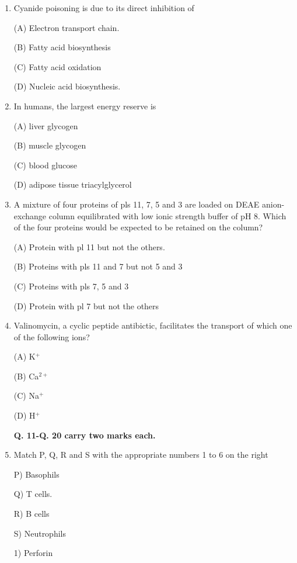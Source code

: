 \documentclass[journal]{IEEEtran}
\begin{document}
\begin{enumerate}
{		(D) its weak electrolytic property}

	\item {Cyanide poisoning is due to its direct inhibition of

(A) Electron transport chain.

(B) Fatty acid biosynthesis

(C) Fatty acid oxidation

		(D) Nucleic acid biosynthesis.}

	\item{ In humans, the largest energy reserve is

(A) liver glycogen

(B) muscle glycogen

(C) blood glucose

(D) adipose tissue triacylglycerol}

\item {A mixture of four proteins of pls 11, 7, 5 and 3 are loaded on DEAE anion-exchange column equilibrated with low ionic strength buffer of pH 8. Which of the four proteins would be expected to be retained on the column?

(A) Protein with pl 11 but not the others.

(B) Proteins with pls 11 and 7 but not 5 and 3

(C) Proteins with pls 7, 5 and 3

(D) Protein with pl 7 but not the others}

\item {Valinomycin, a cyclic peptide antibictic, facilitates the transport of which one of the following ions?}

(A) K$^+$

(B) Ca$^{2+}$

(C) Na$^+$

(D) H$^+$
\begin{center}
\textbf{Q. 11-Q. 20 carry two marks each.}
\end{center}
\item {Match P, Q, R and S with the appropriate numbers 1 to 6 on the right}

	\begin{minipage}{0.5\textwidth}
	\begin{flushleft}

		P) Basophils

Q) T cells.

R) B cells

S) Neutrophils

		\end{flushleft}
		\end{minipage}
	\begin{minipage}{0.5\textwidth}
		\begin{flushright}
1) Perforin


\end{flushright}
\end{minipage}
\end{enumerate}
\end{document}
